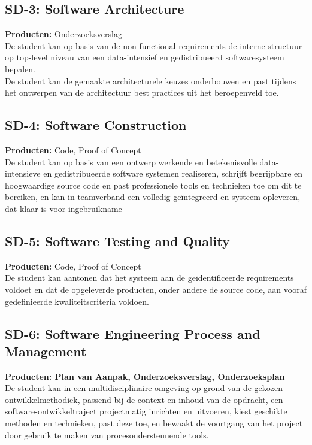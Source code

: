 \subsection{SD-3: Software Architecture}
\textbf{Producten:} Onderzoeksverslag \\
De student kan op basis van de non-functional requirements de interne structuur op top-level niveau van een data-intensief en gedistribueerd softwaresysteem bepalen.
\\
De student kan de gemaakte architecturele keuzes onderbouwen en past tijdens het ontwerpen van de architectuur best practices uit het beroepenveld toe.

\subsection{SD-4: Software Construction}
\textbf{Producten:} Code, Proof of Concept \\
De student kan op basis van een ontwerp werkende en betekenisvolle data- intensieve en gedistribueerde software systemen realiseren, schrijft begrijpbare en hoogwaardige source code en past professionele tools en technieken toe om dit te bereiken, en kan in teamverband een volledig geïntegreerd en systeem opleveren, dat klaar is voor ingebruikname

\subsection{SD-5: Software Testing and Quality}
\textbf{Producten:} Code, Proof of Concept \\
De student kan aantonen dat het systeem aan de geïdentificeerde requirements voldoet en dat de opgeleverde producten, onder andere de source code, aan vooraf gedefinieerde kwaliteitscriteria voldoen.

\newpage
\subsection{SD-6: Software Engineering Process and Management}
\textbf{Producten: Plan van Aanpak, Onderzoeksverslag, Onderzoeksplan} \\
De student kan in een multidisciplinaire omgeving op grond van de gekozen ontwikkelmethodiek, passend bij de context en inhoud van de opdracht, een software-ontwikkeltraject projectmatig inrichten en uitvoeren, kiest geschikte methoden en technieken, past deze toe, en bewaakt de voortgang van het project door gebruik te maken van procesondersteunende tools.

